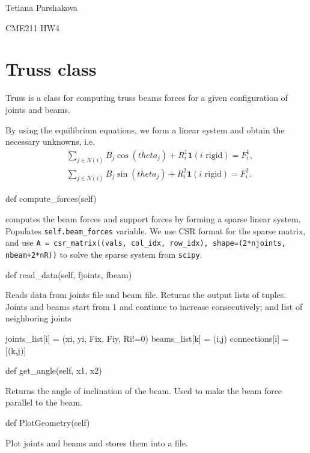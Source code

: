 \documentclass[12pt]{article}
\begin{document}
\begin{center}
    Tetiana Parshakova 
\end{center}
\begin{center}
    \Large CME211 HW4
\end{center}

\section{Truss class}


Truss is a class for computing truss beams forces for a given
	configuration of joints and beams.

By using the equilibrium equations,  we form a linear system and obtain the
	necessary unknowns, i.e.
\begin{align*}
    & \sum_{j \in N(i)} B_j \cos(theta_j) + R_i^1 \mathbf{1}(i \text{ rigid}) = F^1_i,\\
    & \sum_{j \in N(i)} B_j \sin(theta_j) + R_i^2 \mathbf{1}(i \text{ rigid}) = F^2_i.
\end{align*}


\begin{python}
def compute_forces(self)
\end{python}
computes the beam forces and support forces by forming a sparse linear system. Populates \texttt{self.beam\_forces} variable. We use CSR format for the sparse matrix, and use \texttt{A = csr\_matrix((vals, col\_idx, row\_idx), shape=(2*njoints, nbeam+2*nR))} to solve the sparse system from \texttt{scipy}.


\begin{python}
def read_data(self, fjoints, fbeam)
\end{python}
Reads data from joints file and beam file. Returns the output lists of tuples. Joints and beams start from 1 and continue to increase consecutively; and list of neighboring joints
\begin{python}
			joints_list[i] = (xi, yi, Fix, Fiy, Ri!=0)
			beams_list[k] = (i,j)
			connections[i] = [(k,j)]
\end{python}



\begin{python}
def get_angle(self, x1, x2)
\end{python}
Returns the angle of inclination of the beam. Used to make the beam force parallel to the beam.



\begin{python}
def PlotGeometry(self)
\end{python}
Plot joints and beams and stores them into a file.
\end{document}
